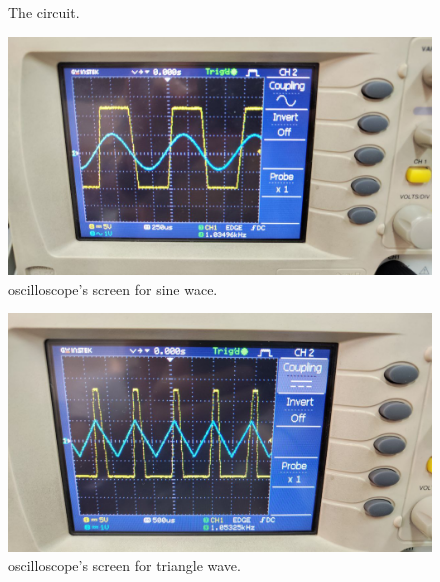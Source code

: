 \documentclass[11pt]{article}
\newcommand{\PicScale}{0.2}
\begin{document}
\begin{question}
\begin{subquestion}
{\begin{figure}[H]
                \caption{The circuit.}
            \end{figure}
            \begin{figure}[H]
                \centering
                \includegraphics[scale=\PicScale,angle=0]{Fig/4.jpeg}
                \caption{oscilloscope's screen for sine wace.}
            \end{figure}
            \begin{figure}[H]
                \centering
                \includegraphics[scale=\PicScale,angle=0]{Fig/51.jpeg}
                \caption{oscilloscope's screen for triangle wave.}
            \end{figure}
        }
    \end{subquestion}


\end{question}
\end{document}
